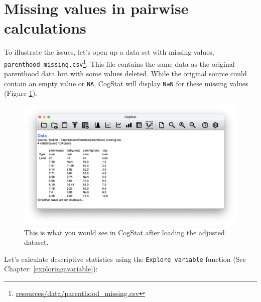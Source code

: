 \documentclass[
  11pt,
  a4paper,
  twoside,symmetric,openright]{book}
\theoremstyle{break}
\theoremstyle{break}
\DeclareRobustCommand{\href}[2]{#2\footnote{\url{#1}}}
\begin{document}
\hypertarget{missingvaluespair}{%
\section{Missing values in pairwise calculations}\label{missingvaluespair}}

To illustrate the issues, let's open up a data set with missing values, \href{resources/data/parenthood_missing.csv}{\texttt{parenthood\_missing.csv}}. This file contains the same data as the original parenthood data but with some values deleted. While the original source could contain an empty value or \texttt{NA}, CogStat will display \texttt{NaN} for these missing values (Figure \ref{fig:parenthoodmissing}).

\begin{figure}

{\centering \includegraphics[width=0.6\linewidth]{resources/image/cogstatparenthood_missing} 

}

\caption{This is what you would see in CogStat after loading the adjusted dataset.}\label{fig:parenthoodmissing}
\end{figure}

Let's calculate descriptive statistics using the \texttt{Explore\ variable} function (See Chapter: \ref{exploringavariable}):
\end{document}
